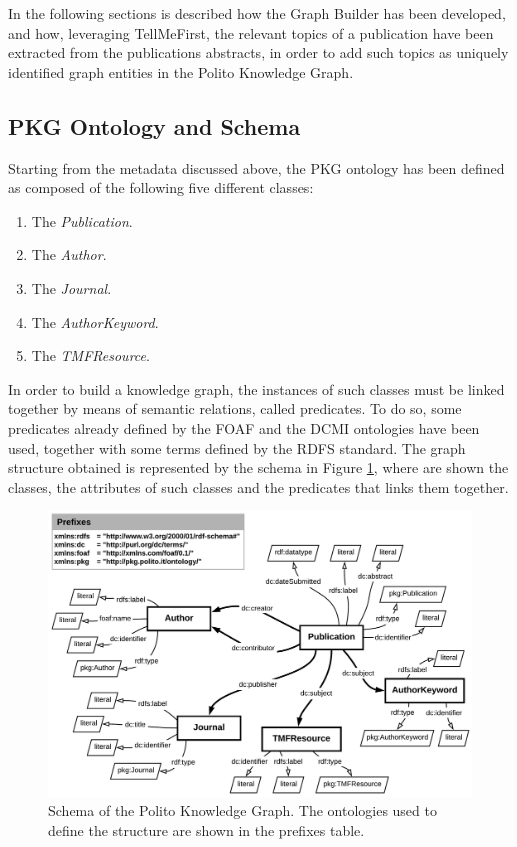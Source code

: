 \documentclass[%
    corpo=13.5pt,
    twoside,
    oldstyle,
    tipotesi=magistrale,
    greek,
    evenboxes
]{toptesi}
\begin{document}
In the following sections is described how the Graph Builder has been developed,
and how, leveraging TellMeFirst, the relevant topics of a publication have been
extracted from the publications abstracts, in order to add such topics as
uniquely identified graph entities in the Polito Knowledge Graph.

\subsection{PKG Ontology and Schema}

Starting from the metadata discussed above, the PKG ontology has been defined
as composed of the following five different classes:

\begin{enumerate}
    \item The \emph{Publication}.
    \item The \emph{Author}.
    \item The \emph{Journal}.
    \item The \emph{AuthorKeyword}.
    \item The \emph{TMFResource}.
\end{enumerate}

In order to build a knowledge graph, the instances of such classes must be
linked together by means of semantic relations, called predicates.
To do so, some predicates already defined by the
FOAF\cite{brickley2007} and the DCMI\cite{weibel1998} ontologies have been used,
together with some terms defined by the RDFS\cite{lassila1998} standard.
The graph structure obtained is represented by the schema in
Figure \ref{fig:schema}, where are shown the classes, the attributes of such
classes and the predicates that links them together.

\begin{figure}[h]
    \centering
    \includegraphics[scale=0.85]{img/schema.png}
    \caption{Schema of the Polito Knowledge Graph. The ontologies used to
    define the structure are shown in the prefixes table.}
    \label{fig:schema}
\end{figure}
\end{document}
